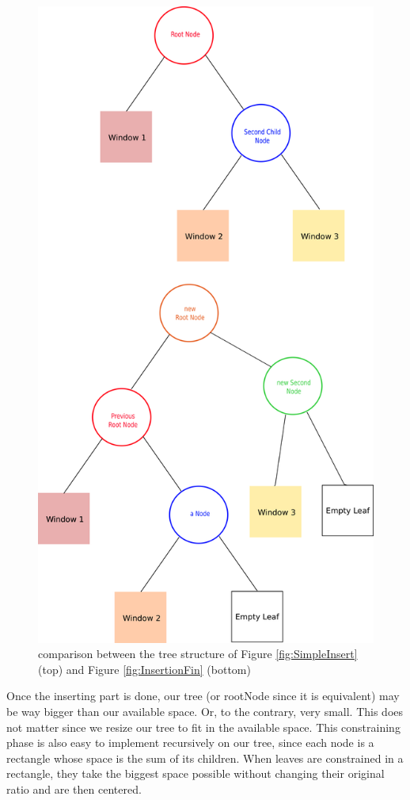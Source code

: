 \documentclass{acmtog}
\begin{document}
\begin{figure}
  \includegraphics[width=\linewidth]{Images/Treestructure.png}
  \caption{comparison between the tree structure of Figure \ref{fig:SimpleInsert} (top) and Figure \ref{fig:InsertionFin} (bottom)}
  \label{fig:TreeStructure}
\end{figure}

Once the inserting part is done, our tree (or rootNode since it is equivalent) may be way bigger than our available space. Or, to the contrary, very small. This does not matter since we resize our tree to fit in the available space. This constraining phase is also easy to implement recursively on our tree, since each node is a rectangle whose space is the sum of its children. When leaves are constrained in a rectangle, they take the biggest space possible without changing their original ratio and are then centered. 
\end{document}
